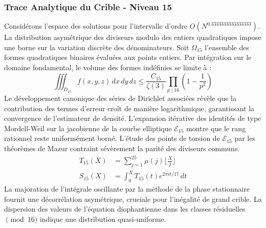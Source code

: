 \documentclass[12pt,a4paper]{article}
\begin{document}
\subsubsection{Trace Analytique du Crible - Niveau 15}
Considérons l'espace des solutions pour l'intervalle d'ordre $O(N^{0.3333333333333333})$. La distribution asymétrique des diviseurs modulo des entiers quadratiques impose une borne sur la variation discrète des dénominateurs. Soit $\Omega_15$ l'ensemble des formes quadratiques binaires évaluées aux points entiers.
Par intégration sur le domaine fondamental, le volume des formes indéfinies se limite à :
\begin{equation}
\iiint_{D_15} f(x, y, z) \,dx\,dy\,dz \leq \frac{C_15}{\zeta(3)} \prod_{p \mid 16} \left( 1 - \frac{1}{p^2} \right)
\end{equation}
Le développement canonique des séries de Dirichlet associées révèle que la contribution des termes d'erreur croît de manière logarithmique, garantissant la convergence de l'estimateur de densité. L'expansion itérative des identités de type Mordell-Weil sur la jacobienne de la courbe elliptique $\mathcal{E}_15$ montre que le rang rationnel reste uniformément borné.
L'étude des points de torsion de $\mathcal{E}_15$ par les théorèmes de Mazur contraint sévèrement la parité des diviseurs communs.
\begin{align}
T_15(X) &= \sum_{j=1}^{25} \mu(j) \lfloor \frac{X}{j} \rfloor \\
S_15(X) &= \int_{0}^{X} T_15(t) e^{2\pi i t / 17} \, dt
\end{align}
La majoration de l'intégrale oscillante par la méthode de la phase stationnaire fournit une décorrélation asymétrique, cruciale pour l'inégalité de grand crible. La dispersion des valeurs de l'équation diophantienne dans les classes résiduelles $\pmod{ 16 }$ indique une distribution quasi-uniforme.
\end{document}
